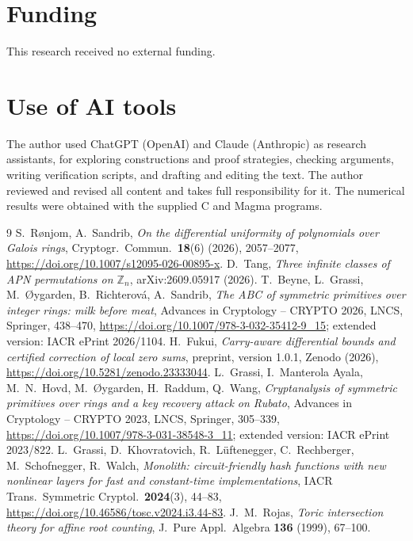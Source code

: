 \documentclass[11pt]{amsart}
\theoremstyle{definition}
\begin{document}
\section*{Funding}
This research received no external funding.

\section*{Use of AI tools}
The author used ChatGPT (OpenAI) and Claude (Anthropic) as research assistants, for exploring constructions and proof strategies,
checking arguments, writing verification scripts, and drafting and editing the text. The author reviewed and revised all content
and takes full responsibility for it. The numerical results were obtained with the supplied C and Magma programs.

\begin{thebibliography}{9}
 S.~R{\o}njom, A.~Sandrib, \emph{On the differential uniformity of polynomials over Galois rings}, Cryptogr.\ Commun.\
\textbf{18}(6) (2026), 2057--2077, \url{https://doi.org/10.1007/s12095-026-00895-x}.
\bibitem{Tang} D.~Tang, \emph{Three infinite classes of APN permutations on $\mathbb Z_n$}, arXiv:2609.05917 (2026).
\bibitem{BGORS} T.~Beyne, L.~Grassi, M.~{\O}ygarden, B.~Richterov\'a, A.~Sandrib, \emph{The ABC of symmetric primitives over integer rings:
milk before meat}, Advances in Cryptology -- CRYPTO 2026, LNCS, Springer, 438--470, \url{https://doi.org/10.1007/978-3-032-35412-9_15};
extended version: IACR ePrint 2026/1104.
 H.~Fukui, \emph{Carry-aware differential bounds and certified correction of local zero sums}, preprint, version 1.0.1,
Zenodo (2026), \url{https://doi.org/10.5281/zenodo.23333044}.
 L.~Grassi, I.~Manterola Ayala, M.~N.~Hovd, M.~{\O}ygarden, H.~Raddum, Q.~Wang, \emph{Cryptanalysis of symmetric
primitives over rings and a key recovery attack on Rubato}, Advances in Cryptology -- CRYPTO 2023, LNCS, Springer, 305--339,
\url{https://doi.org/10.1007/978-3-031-38548-3_11}; extended version: IACR ePrint 2023/822.
\bibitem{Monolith} L.~Grassi, D.~Khovratovich, R.~L\"uftenegger, C.~Rechberger, M.~Schofnegger, R.~Walch, \emph{Monolith:
circuit-friendly hash functions with new nonlinear layers for fast and constant-time implementations}, IACR Trans.\ Symmetric
Cryptol.\ \textbf{2024}(3), 44--83, \url{https://doi.org/10.46586/tosc.v2024.i3.44-83}.
\bibitem{Rojas} J.~M.~Rojas, \emph{Toric intersection theory for affine root counting}, J.\ Pure Appl.\ Algebra \textbf{136} (1999), 67--100.
\end{thebibliography}
\end{document}
